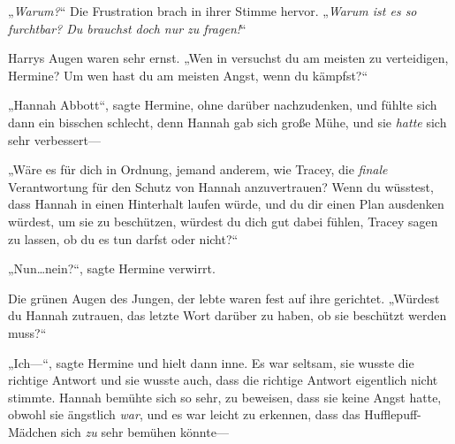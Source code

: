„\emph{Warum?}“ Die Frustration brach in ihrer Stimme hervor. „\emph{Warum ist es so furchtbar? Du brauchst doch nur zu fragen!}“

Harrys Augen waren sehr ernst. „Wen in \SPHEW versuchst du am meisten zu verteidigen, Hermine? Um wen hast du am meisten Angst, wenn du kämpfst?“

„Hannah Abbott“, sagte Hermine, ohne darüber nachzudenken, und fühlte sich dann ein bisschen schlecht, denn Hannah gab sich große Mühe, und sie \emph{hatte} sich sehr verbessert—

„Wäre es für dich in Ordnung, jemand anderem, wie Tracey, die \emph{finale} Verantwortung für den Schutz von Hannah anzuvertrauen? Wenn du wüsstest, dass Hannah in einen Hinterhalt laufen würde, und du dir einen Plan ausdenken würdest, um sie zu beschützen, würdest du dich gut dabei fühlen, Tracey sagen zu lassen, ob du es tun darfst oder nicht?“

„Nun…nein?“, sagte Hermine verwirrt.

Die grünen Augen des Jungen, der lebte waren fest auf ihre gerichtet. „Würdest du Hannah zutrauen, das letzte Wort darüber zu haben, ob sie beschützt werden muss?“

„Ich—“, sagte Hermine und hielt dann inne. Es war seltsam, sie wusste die richtige Antwort und sie wusste auch, dass die richtige Antwort eigentlich nicht stimmte. Hannah bemühte sich so sehr, zu beweisen, dass sie keine Angst hatte, obwohl sie ängstlich \emph{war}, und es war leicht zu erkennen, dass das Hufflepuff-Mädchen sich \emph{zu} sehr bemühen könnte—

